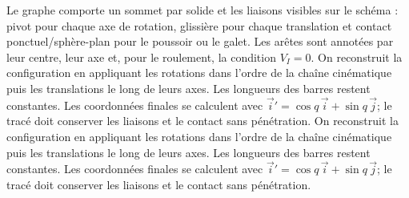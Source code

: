 \begin{corrigebox}
Le graphe comporte un sommet par solide et les
                    liaisons visibles sur le schéma : pivot pour chaque axe de rotation,
                    glissière pour chaque translation et contact ponctuel/sphère-plan pour
                    le poussoir ou le galet. Les arêtes sont annotées par leur centre,
                    leur axe et, pour le roulement, la condition $V_I=0$.
On reconstruit la configuration en appliquant les
                rotations dans l'ordre de la chaîne cinématique puis les translations le
                long de leurs axes. Les longueurs des barres restent constantes. Les
                coordonnées finales se calculent avec
                $\vec i'=\cos q\,\vec i+\sin q\,\vec j$; le tracé doit conserver les
                liaisons et le contact sans pénétration.
On reconstruit la configuration en appliquant les
                rotations dans l'ordre de la chaîne cinématique puis les translations le
                long de leurs axes. Les longueurs des barres restent constantes. Les
                coordonnées finales se calculent avec
                $\vec i'=\cos q\,\vec i+\sin q\,\vec j$; le tracé doit conserver les
                liaisons et le contact sans pénétration.
\end{corrigebox}
